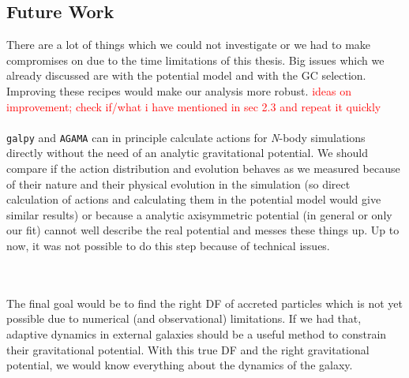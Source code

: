 \subsection{Future Work}
There are a lot of things which we could not investigate or we had to make compromises on due to the time limitations of this thesis. Big issues which we already discussed are with the potential model and with the \ac{GC} selection. Improving these recipes would make our analysis more robust. \textcolor{red}{ideas on improvement; check if/what i have mentioned in sec 2.3 and repeat it quickly}
\\\\
\texttt{galpy} and \texttt{AGAMA} \citep{Vasiliev...AGAMA...2019} can in principle calculate actions for \textit{N}-body simulations directly without the need of an analytic gravitational potential. We should compare if the action distribution and evolution behaves as we measured because of their nature and their physical evolution in the simulation (so direct calculation of actions and calculating them in the potential model would give similar results) or because a analytic axisymmetric potential (in general or only our fit) cannot well describe the real potential and messes these things up. Up to now, it was not possible to do this step because of technical issues. 

\\\\The final goal would be to find the right \ac{DF} of accreted particles which is not yet possible due to numerical (and observational) limitations. If we had that, adaptive dynamics in external galaxies should be a useful method to constrain their gravitational potential. With this true \ac{DF} and the right gravitational potential, we would know everything about the dynamics of the galaxy.

